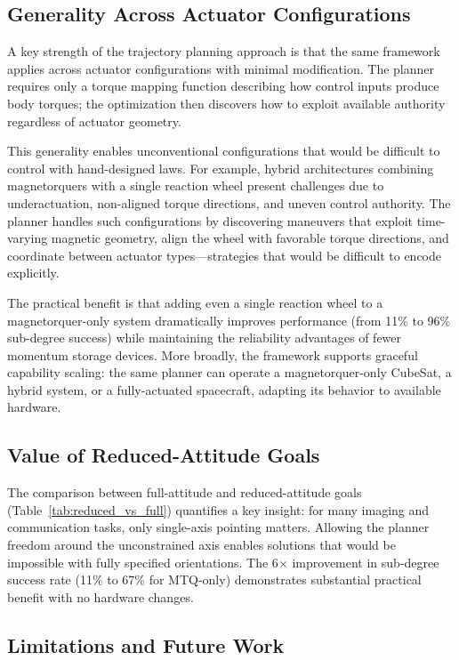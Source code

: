 \documentclass[conference]{IEEEtran}
\begin{document}
\subsection{Generality Across Actuator Configurations}\label{subsec:generality}

A key strength of the trajectory planning approach is that the same framework applies across actuator configurations with minimal modification. The planner requires only a torque mapping function describing how control inputs produce body torques; the optimization then discovers how to exploit available authority regardless of actuator geometry.

This generality enables unconventional configurations that would be difficult to control with hand-designed laws. For example, hybrid architectures combining magnetorquers with a single reaction wheel present challenges due to underactuation, non-aligned torque directions, and uneven control authority. The planner handles such configurations by discovering maneuvers that exploit time-varying magnetic geometry, align the wheel with favorable torque directions, and coordinate between actuator types---strategies that would be difficult to encode explicitly.

The practical benefit is that adding even a single reaction wheel to a magnetorquer-only system dramatically improves performance (from 11\% to 96\% sub-degree success) while maintaining the reliability advantages of fewer momentum storage devices. More broadly, the framework supports graceful capability scaling: the same planner can operate a magnetorquer-only CubeSat, a hybrid system, or a fully-actuated spacecraft, adapting its behavior to available hardware.

\subsection{Value of Reduced-Attitude Goals}\label{subsec:reduced_value}

The comparison between full-attitude and reduced-attitude goals (Table~\ref{tab:reduced_vs_full}) quantifies a key insight: for many imaging and communication tasks, only single-axis pointing matters. Allowing the planner freedom around the unconstrained axis enables solutions that would be impossible with fully specified orientations. The 6$\times$ improvement in sub-degree success rate (11\% to 67\% for MTQ-only) demonstrates substantial practical benefit with no hardware changes.

\subsection{Limitations and Future Work}\label{subsec:limitations}
\end{document}
